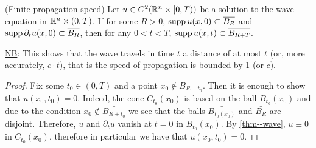 \documentclass[11pt]{article}
\begin{document}
				\begin{cor}
					(Finite propagation speed) Let $u\in C^2(\mathbb{R}^n\times[0,T))$ be a solution to the wave equation in $\mathbb{R}^n\times(0,T)$. If for some $R>0$, $\operatorname{supp} u(x,0)\subset\overline{B_R}$ and $\operatorname{supp}\partial_tu(x,0)\subset\overline{B_R}$, then for any $0<t<T$, $\operatorname{supp} u(x,t)\subset \overline{B_{R+T}}$.
				\end{cor}

				\noindent\underline{NB}: This shows that the wave travels in time $t$ a distance of at most $t$ (or, more accurately, $c\cdot t$), that is the speed of propagation is bounded by 1 (or $c$).

				\begin{proof}
					Fix some $t_0\in(0,T)$ and a point $x_0\notin\bar{B_{R+t_0}}$. Then it is enough to show that $u(x_0,t_0)=0$. Indeed, the cone $C_{t_0}(x_0)$ is based on the ball $\bar{B_{t_0}(x_0)}$ and due to the condition $x_0\notin\bar{B_{R+t_0}}$ we see that the balls $\bar{B_{t_0(x_0)}}$ and $\bar{B_R}$ are disjoint. Therefore, $u$ and $\partial_t u$ vanish at $t=0$ in $\bar{B_{t_0}(x_0)}$. By \autoref{thm--wave}, $u\equiv0$ in $C_{t_0}(x_0)$, therefore in particular we have that $u(x_0,t_0)=0$.
			\end{proof}		
					
\end{document}
